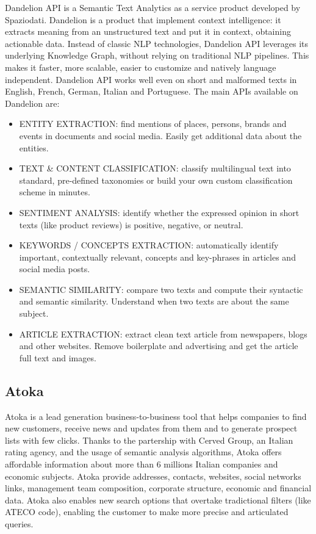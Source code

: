 Dandelion API is a Semantic Text Analytics as a service product developed by Spaziodati.
Dandelion is a product that implement context intelligence: it extracts meaning from an unstructured text and put it in context, obtaining actionable data.
Instead of classic NLP technologies, Dandelion API leverages its underlying Knowledge Graph, without relying on traditional NLP pipelines. This makes it faster, more scalable, easier to customize and natively language independent. Dandelion API works well even on short and malformed texts in English, French, German, Italian and Portuguese.
The main APIs available on Dandelion are: 
\begin{itemize}
    \item ENTITY EXTRACTION: find mentions of places, persons, brands and events in documents and social media. Easily get additional data about the entities.
    \item TEXT \& CONTENT CLASSIFICATION: classify multilingual text into standard, pre-defined taxonomies or build your own custom classification scheme in minutes.
    \item SENTIMENT ANALYSIS: identify whether the expressed opinion in short texts (like product reviews) is positive, negative, or neutral.
    \item KEYWORDS / CONCEPTS EXTRACTION: automatically identify important, contextually relevant, concepts and key-phrases in articles and social media posts.
    \item SEMANTIC SIMILARITY: compare two texts and compute their syntactic and semantic similarity. Understand when two texts are about the same subject.
    \item ARTICLE EXTRACTION: extract clean text article from newspapers, blogs and other websites. Remove boilerplate and advertising and get the article full text and images.
\end{itemize}

\subsection{Atoka}

Atoka is a lead generation business-to-business tool that helps companies to find new customers, receive news and updates from them and to generate prospect lists with few clicks.
Thanks to the partership with Cerved Group, an Italian rating agency, and the usage of semantic analysis algorithms, Atoka offers affordable information about more than 6 millions Italian companies and economic subjects.
Atoka provide addresses, contacts, websites, social networks links, management  team composition, corporate structure, economic and financial data.
Atoka also enables new search options that overtake tradictional filters (like ATECO code), enabling the customer to make more precise and articulated queries.

